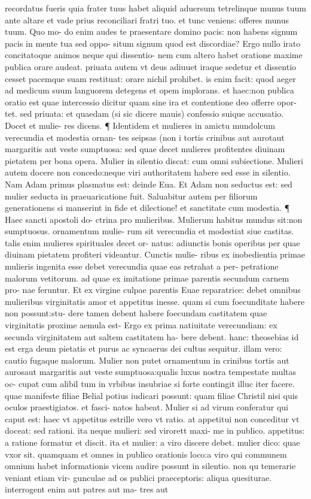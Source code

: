 \documentclass{article}
\begin{document}
\begin{pages}
\marginpar{[ p.2 ]}\pstart recordatus fueris quia frater tuus habet aliquid aduersum tetrelinque munus tuum ante altare et vade prius reconciliari fratri tuo. et tunc veniens: offeres munus tuum. Quo mo- do enim audes te praesentare domino pacis: non habens signum pacis in mente tua sed oppo- situm signum quod est discordiae? Ergo nullo irato concitatoque  animos neque  qui dissentio- nem cum altero habet oratione maxime publica orare audeat. priuata autem vt deus adiuuet iraque  sedetur et dissentio cesset pacemque  suam restituat: orare nichil prohibet. is enim facit: quod aeger ad medicum suum languorem detegens et opem implorans. et haec:non publica oratio est quae intercessio dicitur quam sine ira et contentione deo offerre opor- tet. sed priuata: et quaedam (si sic dicere mauis) confessio suique  accusatio. Docet et mulie-   res dicens. ¶ Identidem et mulieres in amictu mundolcum verecundia et modestia ornan-   tes seipsas (non i tortis crinibus aut aurotaut margaritis aut veste sumptuosa: sed quae   decet mulieres profitentes diuinam pietatem per bona opera. Mulier in silentio discat:   cum omni subiectione. Mulieri autem docere non concedo:neque  viri authoritatem habere    sed esse in silentio. Nam Adam primus plasmatus est: deinde Eua. Et Adam non seductus   est: sed mulier seducta  in praeuaricatione fuit. Saluabitur autem per filiorum generationens   si manserint in fide et dilectione! et sanctitate cum modestia. ¶ Haec sancti apostoli do- ctrina pro mulieribus. Mulierum habitus mundus sit:non sumptuosus. ornamentum mulie- rum sit verecundia   et modestiat siue castitas. talis enim mulieres spirituales decet or- natus: adiunctis bonis operibus per quae diuinam pietatem profiteri videantur. Cunctis mulie- ribus ex inobedientia primae mulieris ingenita esse debet verecundia quae eas retrahat a per- petratione malorum vetitorum. ad quae ex imitatione primae parentis secundum carnem pro- nae feruntur. Et ex virgine  culpae parentis Euae reparatrice: debet omnibus mulieribus virginitatis amor et appetitus inesse. quam si cum foecunditate habere non possunt:stu- dere tamen debent habere foecundam castitatem quae virginitatis proxime aemula est- Ergo ex prima natiuitate verecundiam: ex secunda virginitatem aut saltem castitatem ha- bere debent. hanc: theosebias id est erga deum pietatis  et purus ac syncaerus dei cultus sequitur. illam vero: cautio fugaque  malorum. Mulier non putet ornamentum in crinibus tortis aut aurosaut margaritis aut veste sumptuosa:qualis luxus nostra tempestate multas oc- cupat cum alibil tum in vrbibus insubriae si forte contingit illuc iter facere. quae manifeste filiae Belial potius iudicari possunt: quam filiae Christil nisi quis oculos praestigiatos. et fasci- natos habeat. Mulier si ad virum conferatur qui caput est: haec vt appetitus estrille vero vt ratio. at appetitui non conceditur vt doceat: sed rationi. ita neque  mulieri: sed virorett maxi- me in publico. appetitus: a ratione formatur et discit. ita et mulier: a viro discere debet. mulier dico: quae vxor sit. quamquam et omnes in publico orationis loco:a viro qui communem omnium habet informationis vicem audire possunt in silentio. non qu temerarie veniant etiam vir- gunculae ad os publici praeceptoris: aliqua quesiturae. interrogent enim aut patres aut ma- tres aut 
\end{pages}
\end{document}

